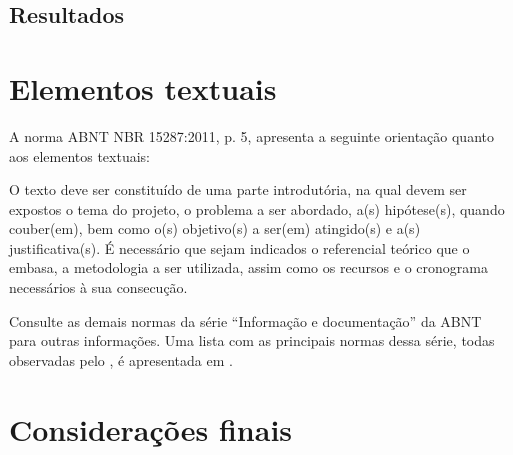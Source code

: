 \documentclass[
    12pt,               %
    twoside,            %
    a4paper,            %
    english,            %
    french,             %
    spanish,            %
    brazil,             %
    ]{abntex2}
\begin{document}
\section{Resultados}

\chapter{Elementos textuais}

A norma ABNT NBR 15287:2011, p. 5, apresenta a
seguinte orientação quanto aos elementos textuais:

\begin{citacao}
O texto deve ser constituído de uma parte introdutória, na qual devem ser
expostos o tema do projeto, o problema a ser abordado, a(s) hipótese(s),
quando couber(em), bem como o(s) objetivo(s) a ser(em) atingido(s) e a(s)
justificativa(s). É necessário que sejam indicados o referencial teórico que
o embasa, a metodologia a ser utilizada, assim como os recursos e o cronograma
necessários à sua consecução.
\end{citacao}

Consulte as demais normas da série ``Informação e documentação'' da ABNT
para outras informações. Uma lista com as principais normas dessa série, todas
observadas pelo \abnTeX, é apresentada em .





\chapter*[Considerações finais]{Considerações finais}

\lipsum[31-33]

\postextual


\end{document}
